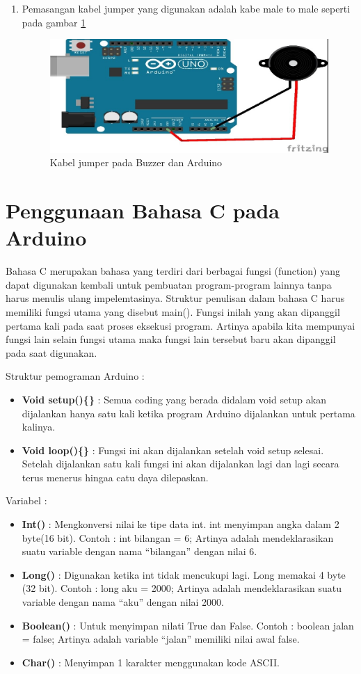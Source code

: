 \begin{enumerate}
\item Pemasangan kabel jumper yang digunakan adalah kabe male to male seperti pada gambar \ref{fig:buzzer}

\begin{figure}[!htbp]
\centering
\includegraphics[width=.75\textwidth]{figures/CONV/buzzer.jpg}
\caption{Kabel jumper pada Buzzer dan Arduino}\label{fig:buzzer}
\end{figure}
\end{enumerate}

\section{Penggunaan Bahasa C pada Arduino}
Bahasa C merupakan bahasa yang terdiri dari berbagai fungsi (function) yang dapat digunakan kembali untuk pembuatan program-program lainnya tanpa harus menulis ulang impelemtasinya. Struktur penulisan dalam bahasa C harus memiliki fungsi utama yang disebut main(). Fungsi inilah yang akan dipanggil pertama kali pada saat proses eksekusi program. Artinya apabila kita mempunyai fungsi lain selain fungsi utama maka fungsi lain tersebut baru akan dipanggil pada saat digunakan.

Struktur pemograman Arduino :
\begin{itemize}
\item \textbf{Void setup()\{\}} : Semua coding yang berada didalam void setup akan dijalankan hanya satu kali ketika program Arduino dijalankan untuk pertama kalinya.
\item \textbf{Void loop()\{\}} : Fungsi ini akan dijalankan setelah void setup selesai. Setelah dijalankan satu kali fungsi ini akan dijalankan lagi dan lagi secara terus menerus hingaa catu daya dilepaskan.
\end{itemize}

Variabel :
\begin{itemize}
\item \textbf{Int()} : Mengkonversi nilai ke tipe data int. int menyimpan angka dalam 2 byte(16 bit).
Contoh : int bilangan = 6;
	Artinya adalah mendeklarasikan suatu variable dengan nama “bilangan” dengan nilai 6.
\item \textbf{Long()} : Digunakan ketika int tidak mencukupi lagi. Long memakai 4 byte (32 bit).
Contoh : long aku = 2000;
	Artinya adalah mendeklarasikan suatu variable dengan nama “aku” dengan nilai 2000.
\item \textbf{Boolean()} : Untuk menyimpan nilati True dan False.
Contoh : boolean jalan = false;
	Artinya adalah variable “jalan” memiliki nilai awal false.
\item \textbf{Char()} : Menyimpan 1 karakter menggunakan kode ASCII.
\end{itemize}

